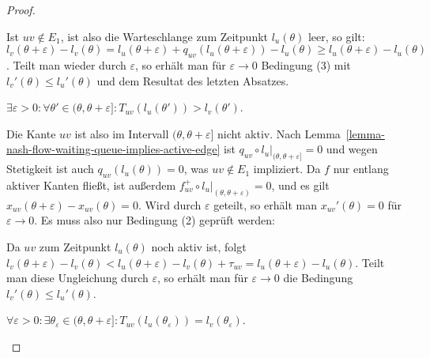 \begin{proof}
\begin{description}[leftmargin=0cm, topsep=0cm, itemindent=\parindent]
		Ist $uv\notin E_1$, ist also die Warteschlange zum Zeitpunkt $l_u(\theta)$ leer, so gilt: $l_v(\theta+\varepsilon) - l_v(\theta) = l_u(\theta + \varepsilon) + q_{uv}(l_u(\theta + \varepsilon)) - l_u(\theta) \geq l_u(\theta + \varepsilon) - l_u(\theta)$.
		Teilt man wieder durch $\varepsilon$, so erhält man für $\varepsilon  \rightarrow 0$ Bedingung (3) mit $l_v'(\theta) \leq l_u'(\theta)$ und dem Resultat des letzten Absatzes.
		
		\item[2. Fall:] $\exists \varepsilon > 0: \forall \theta'\in(\theta, \theta + \varepsilon]: T_{uv}(l_u(\theta'))>l_v(\theta')$.
		
		Die Kante ${uv}$ ist also im Intervall $(\theta, \theta + \varepsilon]$ nicht aktiv.
		Nach Lemma~\ref{lemma-nash-flow-waiting-queue-implies-active-edge} ist $q_{uv} \circ l_u\big|_{(\theta, \theta+\varepsilon]}=0$ und wegen Stetigkeit ist auch $q_{uv}(l_u(\theta))=0$, was $uv\notin E_1$ impliziert.
		Da $f$ nur entlang aktiver Kanten fließt, ist außerdem $f_{uv}^+ \circ l_u \big|_{(\theta, \theta+\varepsilon)} = 0$, und es gilt $x_{uv}(\theta + \varepsilon) - x_{uv}(\theta)=0$.
		Wird durch $\varepsilon$ geteilt, so erhält man $x_{uv}'(\theta) = 0$ für $\varepsilon\rightarrow0$.
		Es muss also nur Bedingung (2) geprüft werden:
		
		
		Da $uv$ zum Zeitpunkt $l_u(\theta)$ noch aktiv ist, folgt $l_v(\theta + \varepsilon) - l_v(\theta) < l_u(\theta+\varepsilon) - l_v(\theta) + \tau_{uv} = l_u(\theta + \varepsilon) - l_u(\theta)$.
		Teilt man diese Ungleichung  durch $\varepsilon$, so erhält man für $\varepsilon\rightarrow 0$ die Bedingung $l_v'(\theta)\leq l_u'(\theta)$.
		
		\item[3. Fall:] $\forall \varepsilon>0: \exists \theta_{\varepsilon}\in (\theta, \theta+\varepsilon]: T_{uv}(l_u(\theta_\varepsilon)) = l_v(\theta_\varepsilon)$.
		

\end{description}
\end{proof}
